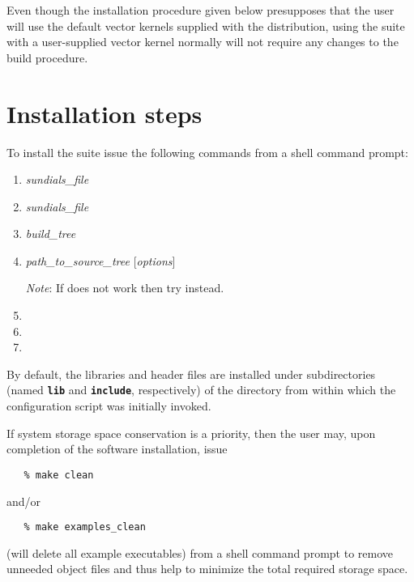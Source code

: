 Even though the installation procedure given below presupposes that the user will use the default 
vector kernels supplied with the distribution, using the {\sundials} suite with a 
user-supplied vector kernel normally will not require any changes to the build procedure.  


\section{Installation steps}

To install the {\sundials} suite issue the following commands from a shell command prompt:
\begin{enumerate}
\item {} \textit{sundials\_file}
\item {} \textit{sundials\_file}
\item {} {\em build\_tree}
\item {\em path\_to\_source\_tree} [\textit{options}]

{\em Note}: If  does not work then try  instead.
\item {}
\item {}
\item {}
\end{enumerate}

By default, the {\sundials} libraries and header files are installed under subdirectories 
(named \texttt{\textbf{lib}} and \texttt{\textbf{include}}, respectively) of the directory 
from within which the configuration script was initially invoked.

If system storage space conservation is a priority, then the user may, upon completion of the software 
installation, issue 
\begin{verbatim}
   % make clean
\end{verbatim}
and/or 
\begin{verbatim}
   % make examples_clean
\end{verbatim}
(will delete all example executables) from a shell command prompt to remove unneeded object files and 
thus help to minimize the total required storage space.


